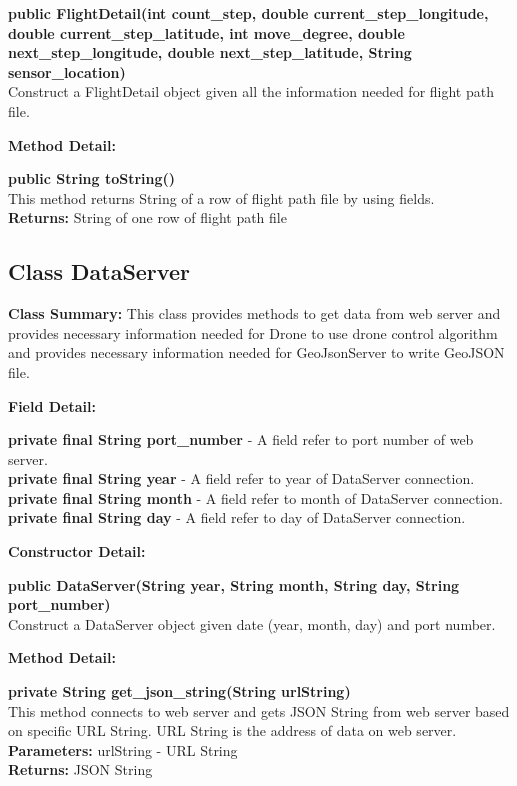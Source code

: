\documentclass[12pt]{article}
\begin{document}
\textbf{public FlightDetail(int count\_step, double current\_step\_longitude, double current\_step\_latitude, int move\_degree, double next\_step\_longitude, double next\_step\_latitude, String sensor\_location)}\\
Construct a FlightDetail object given all the information needed for flight path file.

\textbf{Method Detail:}

\textbf{public String toString()}\\
This method returns String of a row of flight path file by using fields.\\
\textbf{Returns:} String of one row of flight path file

\subsection {Class DataServer}
\textbf{Class Summary:} This class provides methods to get data from web server and provides necessary information needed for Drone to use drone control algorithm and provides necessary information needed for GeoJsonServer to write GeoJSON file.

\textbf{Field Detail:}

\textbf{private final String port\_number} - A field refer to port number of web server.\\
\textbf{private final String year} - A field refer to year of DataServer connection.\\
\textbf{private final String month} - A field refer to month of DataServer connection.\\
\textbf{private final String day} - A field refer to day of DataServer connection.

\textbf{Constructor Detail:}

\textbf{public DataServer(String year, String month, String day, String port\_number)}\\
Construct a DataServer object given date (year, month, day) and port number.

\textbf{Method Detail:}

\textbf{private String get\_json\_string(String urlString)}\\
This method connects to web server and gets JSON String from web server based on specific URL String. URL String is the address of data on web server.\\
\textbf{Parameters:} urlString - URL String\\
\textbf{Returns:} JSON String
\end{document}
